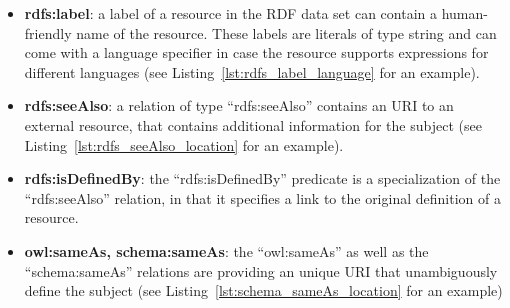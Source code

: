 \begin{itemize}
  \item \textbf{rdfs:label}: a label of a resource in the \gls{RDF} data set can contain a human-friendly name of the resource. These labels are literals of type string and can come with a language specifier in case the resource supports expressions for different languages (see Listing~\ref{lst:rdfs_label_language} for an example).
  \item \textbf{rdfs:seeAlso}: a relation of type ``rdfs:seeAlso'' contains an \gls{URI} to an external resource, that contains additional information for the subject (see Listing~\ref{lst:rdfs_seeAlso_location} for an example).
	\item \textbf{rdfs:isDefinedBy}: the ``rdfs:isDefinedBy'' predicate is a specialization of the ``rdfs:seeAlso'' relation, in that it specifies a link to the original definition of a resource.
	\item \textbf{owl:sameAs, schema:sameAs}: the ``owl:sameAs'' as well as the ``schema:sameAs'' relations are providing an unique \gls{URI} that unambiguously define the subject (see Listing~\ref{lst:schema_sameAs_location} for an example)
\end{itemize}




